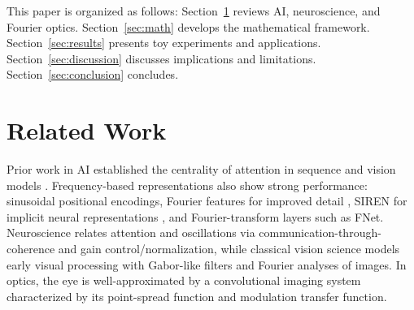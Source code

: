 \documentclass[12pt]{article}
\begin{document}
This paper is organized as follows: Section~\ref{sec:related} reviews AI, neuroscience, and Fourier optics. Section~\ref{sec:math} develops the mathematical framework. Section~\ref{sec:results} presents toy experiments and applications. Section~\ref{sec:discussion} discusses implications and limitations. Section~\ref{sec:conclusion} concludes.

\section{Related Work}\label{sec:related}
%
Prior work in AI established the centrality of attention in sequence and vision models \citep{vaswani2017attention, dosovitskiy2021an}. Frequency-based representations also show strong performance: sinusoidal positional encodings, Fourier features for improved detail \citep{tancik2020fourier}, SIREN for implicit neural representations \citep{sitzmann2020implicit}, and Fourier-transform layers such as FNet. Neuroscience relates attention and oscillations via communication-through-coherence and gain control/normalization, while classical vision science models early visual processing with Gabor-like filters and Fourier analyses of images. In optics, the eye is well-approximated by a convolutional imaging system characterized by its point-spread function and modulation transfer function.

\end{document}
